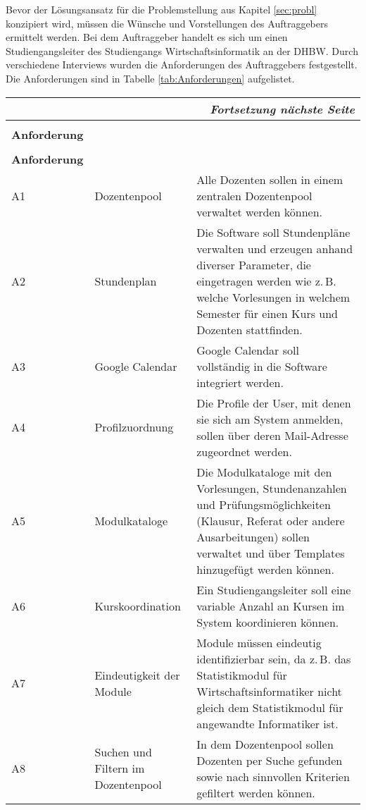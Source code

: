 Bevor der Lösungsansatz für die Problemstellung aus Kapitel \vref{sec:probl} konzipiert wird, müssen die Wünsche und Vorstellungen des Auftraggebers ermittelt werden. Bei dem Auftraggeber handelt es sich um einen Studiengangsleiter   des Studiengangs Wirtschaftsinformatik an der DHBW. Durch verschiedene Interviews wurden die Anforderungen des Auftraggebers festgestellt. Die Anforderungen sind in Tabelle \ref{tab:Anforderungen} aufgelistet. 
\begin{longtable}[h]{|p{}|p{4cm}|p{}|}		
	\multicolumn{3}{|r|}{\textit{Fortsetzung nächste Seite}} \\ \hline
	\endfoot
	\endlastfoot
	\hline &&\\[-0.5em]
	\textbf{Anforderung} & \head{Kurztitel} & \head{Beschreibung} \\ \hline
	\endfirsthead
	\hline &&\\[-0.5em]
	\textbf{Anforderung} & \head{Kurztitel} & \head{Beschreibung} \\ \hline
	\endhead
	\parbox[t]{3cm}{A1} & Dozentenpool & Alle Dozenten sollen in einem zentralen Dozentenpool verwaltet werden können.\\ \hline
	\parbox[t]{3cm}{A2} & Stundenplan & Die Software soll Stundenpläne verwalten und erzeugen anhand diverser Parameter, die eingetragen werden wie z.\,B. welche Vorlesungen in welchem Semester für einen Kurs und Dozenten stattfinden.\\ \hline
	\parbox[t]{3cm}{A3} & Google Calendar & Google Calendar soll vollständig in die Software integriert werden.\\ \hline
	\parbox[t]{3cm}{A4} & Profilzuordnung & Die Profile der User, mit denen sie sich am System anmelden, sollen über deren  Mail-Adresse zugeordnet werden.\\ \hline
	\parbox[t]{3cm}{A5} & Modulkataloge & Die Modulkataloge mit den Vorlesungen, Stundenanzahlen und Prüfungsmöglichkeiten (Klausur, Referat oder andere Ausarbeitungen) sollen verwaltet und über Templates hinzugefügt werden können.\\ \hline
	\parbox[t]{3cm}{A6} & Kurskoordination & Ein Studiengangsleiter soll eine variable Anzahl an Kursen im System koordinieren können.\\ \hline
	\parbox[t]{3cm}{A7} & Eindeutigkeit der Module & Module müssen eindeutig identifizierbar sein, da z.\,B. das Statistikmodul für Wirtschaftsinformatiker nicht gleich dem Statistikmodul für angewandte Informatiker ist.\\ \hline
	\parbox[t]{3cm}{A8} & Suchen und Filtern im Dozentenpool & In dem Dozentenpool sollen Dozenten per Suche gefunden sowie nach sinnvollen Kriterien gefiltert werden können.\\ \hline

\end{longtable}
